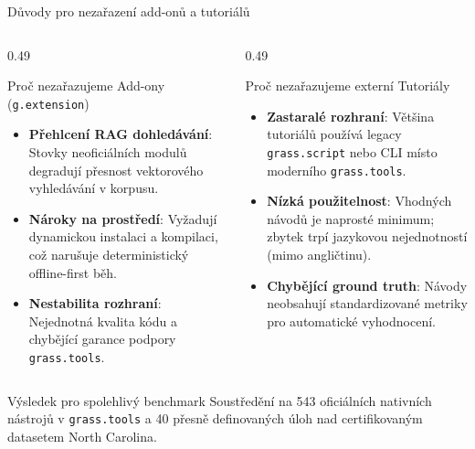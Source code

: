 \documentclass[aspectratio=169,10pt]{beamer}
\begin{document}
\begin{frame}[t]{Důvody pro nezařazení add-onů a tutoriálů}
  \small
  \begin{columns}[T,onlytextwidth]
    \begin{column}{0.49\textwidth}
      \begin{block}{Proč nezařazujeme Add-ony (\texttt{g.extension})}
        \begin{itemize}
          \item \textbf{Přehlcení RAG dohledávání}: Stovky neoficiálních modulů degradují přesnost vektorového vyhledávání v korpusu.
          \item \textbf{Nároky na prostředí}: Vyžadují dynamickou instalaci a kompilaci, což narušuje deterministický offline-first běh.
          \item \textbf{Nestabilita rozhraní}: Nejednotná kvalita kódu a chybějící garance podpory \texttt{grass.tools}.
        \end{itemize}
      \end{block}
    \end{column}

    \begin{column}{0.49\textwidth}
      \begin{block}{Proč nezařazujeme externí Tutoriály}
        \begin{itemize}
          \item \textbf{Zastaralé rozhraní}: Většina tutoriálů používá legacy \texttt{grass.script} nebo CLI místo moderního \texttt{grass.tools}.
          \item \textbf{Nízká použitelnost}: Vhodných návodů je naprosté minimum; zbytek trpí jazykovou nejednotností (mimo angličtinu).
          \item \textbf{Chybějící ground truth}: Návody neobsahují standardizované metriky pro automatické vyhodnocení.
        \end{itemize}
      \end{block}
    \end{column}
  \end{columns}

  \vspace{3mm}

  \begin{alertblock}{Výsledek pro spolehlivý benchmark}
    Soustředění na 543 oficiálních nativních nástrojů v \texttt{grass.tools} a 40 přesně definovaných úloh nad certifikovaným datasetem North Carolina.
  \end{alertblock}
\end{frame}
\end{document}
